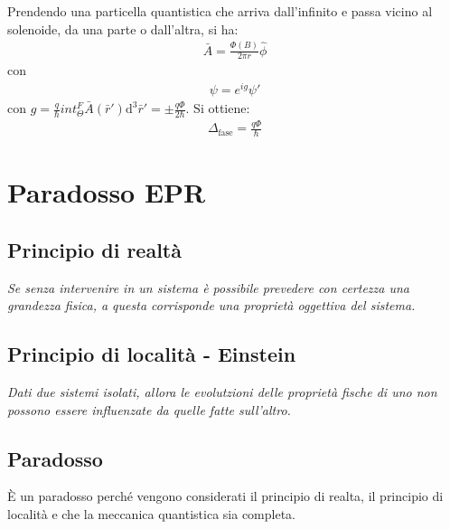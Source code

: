 Prendendo una particella quantistica che arriva dall'infinito e passa vicino al solenoide, da una parte o dall'altra, si ha:
\begin{equation}\begin{split}
\bar A=\frac{\Phi\left(B\right)}{2\pi r}\hat\phi
\end{split}\end{equation}
con
\begin{equation}\begin{split}
\psi =e^{ig}\psi '
\end{split}\end{equation}
con $g=\frac{q}{\hbar }int_{\Theta}^{F}{\bar A\left(\bar r'\right)\textrm{d}^3\bar r'}=\pm\frac{q\Phi}{2\hbar }$. Si ottiene:
\begin{equation}\begin{split}
\Delta_{\textrm{fase}}=\frac{q\Phi}{\hbar }
\end{split}\end{equation}

\section{Paradosso EPR} %
\subsection{Principio di realtà} %
\emph{Se senza intervenire in un sistema è possibile prevedere con certezza una grandezza fisica, a questa corrisponde una proprietà oggettiva del sistema.}

\subsection{Principio di località - Einstein} %
\emph{Dati due sistemi isolati, allora le evolutzioni delle proprietà fische di uno non possono essere influenzate da quelle fatte sull'altro.}

\subsection{Paradosso} %
È un paradosso perché vengono considerati il principio di realta, il principio di località e che la meccanica quantistica sia completa.

